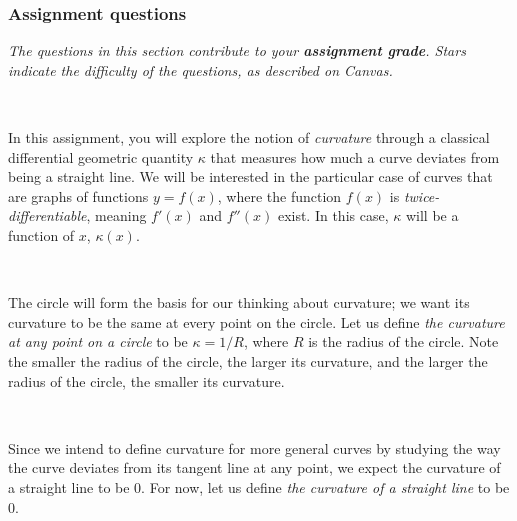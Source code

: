 \documentclass{exam}
\begin{document}
\subsubsection*{Assignment questions}



\textit{The questions in this section contribute to your \textbf{assignment grade}. Stars indicate the difficulty of the questions, as described on Canvas.}

\


In this assignment, you will explore the notion of \textit{curvature} through a classical differential geometric quantity $\kappa$ that measures how much a curve deviates from being a straight line. We will be interested in the particular case of curves that are graphs of functions $y=f(x)$, where the function $f(x)$ is \textit{twice-differentiable}, meaning $f'(x)$ and $f''(x)$ exist.  In this case, $\kappa$ will be a function of $x$, $\kappa(x)$.

\

The circle will form the basis for our thinking about curvature; we want its curvature to be the same at every point on the circle. Let us define \textit{the curvature at any point on a circle} to be $\kappa = 1/R$, where $R$ is the radius of the circle. Note the smaller the radius of the circle, the larger its curvature, and the larger the radius of the circle, the smaller its curvature.

\

Since we intend to define curvature for more general curves by studying the way the curve deviates from its tangent line at any point, we expect the curvature of a straight line to be 0. For now, let us define \textit{the curvature of a straight line} to be 0. 
\end{document}
